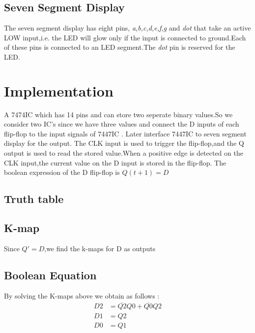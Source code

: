 \documentclass[10pt,a4paper]{article}
\begin{document}
\subsection{Seven Segment Display} \vspace{5mm}
The seven segment display has eight pins, \emph{a,b,c,d,e,f,g} and \emph{dot} that take an active LOW input,i.e. the LED will glow only if the input is connected to ground.Each of these pins is connected to an LED segment.The \emph{dot} pin is reserved for the LED.
\section{Implementation}
A 7474IC which  has 14 pins and can store two seperate binary values.So we consider two IC's since we have three values  and connect the  D inputs of each flip-flop to the input signals of 7447IC . Later interface 7447IC to seven segment display for the output. The CLK input is used to trigger the flip-flop,and the Q output is used to read the stored value.When a positive edge is detected on the CLK input,the current value on the D input is stored in the flip-flop. The boolean expression of the D flip-flop is $Q(t+1) = D$
\subsection{Truth table}

\subsection{K-map}
Since $Q'= D$,we find the k-maps for D as outputs
\newline


   


\subsection{Boolean Equation}
By solving the K-maps above we obtain as follows :
\begin{align}
	D2 &= \overline{Q2}Q0 + \overline{Q0}Q2 \\
	D1 &= Q2 \\
	D0 &= Q1 
\end{align}
\end{document}
